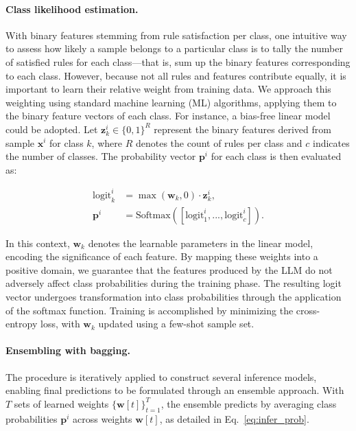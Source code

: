 \paragraph{Class likelihood estimation.} With binary features stemming from rule satisfaction per class, one intuitive way to assess how likely a sample belongs to a particular class is to tally the number of satisfied rules for each class—that is, sum up the binary features corresponding to each class. However, because not all rules and features contribute equally, it is important to learn their relative weight from training data. We approach this weighting using standard machine learning (ML) algorithms, applying them to the binary feature vectors of each class. For instance, a bias-free linear model could be adopted. Let $\mathbf{z}_k^i \in \{0, 1\}^R$ represent the binary features derived from sample $\mathbf{x}^i$ for class $k$, where $R$ denotes the count of rules per class and $c$ indicates the number of classes. The probability vector $\mathbf{p}^i$ for each class is then evaluated as:

\begin{align}
\text{logit}_k^i &= \max(\mathbf{w}_k, 0) \cdot \mathbf{z}_k^i, \nonumber \\
\mathbf{p}^i &= \text{Softmax}({[\text{logit}_{1}^i, ..., \text{logit}_{c}^i]}). \label{eq:infer_prob}
\end{align}

In this context, $\mathbf{w}_k$ denotes the learnable parameters in the linear model, encoding the significance of each feature. By mapping these weights into a positive domain, we guarantee that the features produced by the LLM do not adversely affect class probabilities during the training phase. The resulting logit vector undergoes transformation into class probabilities through the application of the softmax function. Training is accomplished by minimizing the cross-entropy loss, with $\mathbf{w}_k$ updated using a few-shot sample set.

\vspace*{-0.12in}
\paragraph{Ensembling with bagging.} The procedure is iteratively applied to construct several inference models, enabling final predictions to be formulated through an ensemble approach. With $T$ sets of learned weights $\{\mathbf{w}[t]\}_{t=1}^T$, the ensemble predicts by averaging class probabilities $\mathbf{p}^i$ across weights $\mathbf{w}[t]$, as detailed in Eq.~\ref{eq:infer_prob}.


